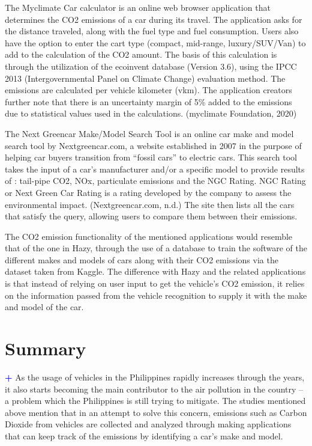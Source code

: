 	The Myclimate Car calculator is an online web browser application that determines the CO2 emissions of a car during its travel. The application asks for the distance traveled, along with the fuel type and fuel consumption. Users also have the option to enter the cart type (compact, mid-range, luxury/SUV/Van) to add to the calculation of the CO2 amount.  The basis of this calculation is through the utilization of the ecoinvent database (Version 3.6), using the IPCC 2013  (Intergovernmental Panel on Climate Change) evaluation method. The emissions are calculated per vehicle kilometer (vkm). The application creators further note that there is an uncertainty margin of 5\% added to the emissions due to statistical values used in the calculations. (myclimate Foundation, 2020)

	The Next Greencar Make/Model Search Tool is an online car make and model search tool by Nextgreencar.com, a website established in 2007 in the purpose of helping car buyers transition from “fossil cars” to electric cars. This search tool takes the input of a car’s manufacturer and/or a specific model to provide results of : tail-pipe CO2, NOx, particulate emissions and the NGC Rating. NGC Rating or Next Green Car Rating is a rating developed by the company to assess the environmental impact. (Nextgreencar.com, n.d.)  The site then lists all the cars that satisfy the query, allowing users to compare them between their emissions. 

	The CO2 emission functionality of the mentioned applications would resemble that of the one in Hazy, through the use of a database to train the software of the different makes and models of cars along with their CO2 emissions via the dataset taken from Kaggle. The difference with Hazy and the related applications is that instead of relying on user input to get the vehicle’s CO2 emission, it relies on the information passed from the vehicle recognition to supply it with the make and model of the car.

\section{Summary}
\textcolor{blue}{\textbf{+}}  As the usage of vehicles in the Philippines rapidly increases through the years, it also starts becoming the main contributor to the air pollution in the country – a problem which the Philippines is still trying to mitigate. The studies mentioned above mention that in an attempt to solve this concern, emissions such as Carbon Dioxide from vehicles are collected and analyzed through making applications that can keep track of the emissions by identifying a car’s make and model.

